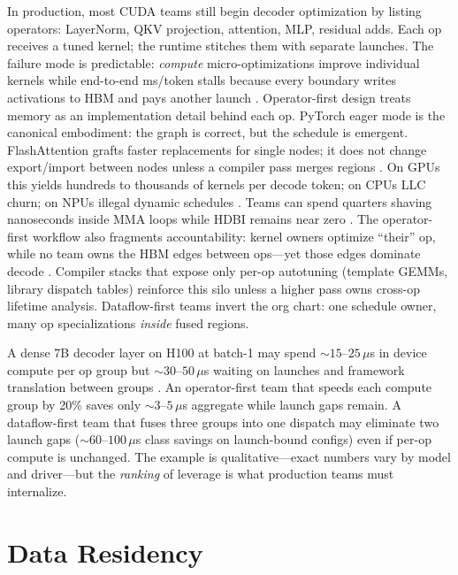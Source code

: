 In production, most CUDA teams still begin decoder optimization by listing operators: LayerNorm, QKV projection, attention, MLP, residual adds.
Each op receives a tuned kernel; the runtime stitches them with separate launches.
The failure mode is predictable: \emph{compute} micro-optimizations improve individual kernels while end-to-end ms/token stalls because every boundary writes activations to HBM and pays another launch \citep{taxbreak2026}.
Operator-first design treats memory as an implementation detail behind each op.
PyTorch eager mode is the canonical embodiment: the graph is correct, but the schedule is emergent.
FlashAttention grafts faster replacements for single nodes; it does not change export/import between nodes unless a compiler pass merges regions \citep{dao2022flashattention}.
On GPUs this yields hundreds to thousands of kernels per decode token; on CPUs LLC churn; on NPUs illegal dynamic schedules \citep{amd2024xdna}.
Teams can spend quarters shaving nanoseconds inside MMA loops while HDBI remains near zero \citep{taxbreak2026,memoryfloor2026}.
The operator-first workflow also fragments accountability: kernel owners optimize ``their'' op, while no team owns the HBM edges between ops---yet those edges dominate decode \citep{memoryfloor2026}.
Compiler stacks that expose only per-op autotuning (template GEMMs, library dispatch tables) reinforce this silo unless a higher pass owns cross-op lifetime analysis.
Dataflow-first teams invert the org chart: one schedule owner, many op specializations \emph{inside} fused regions.

\begin{example}
A dense 7B decoder layer on H100 at batch-1 may spend ${\sim}15$--$25$\,$\mu$s in device compute per op group but ${\sim}30$--$50$\,$\mu$s waiting on launches and framework translation between groups \citep{memoryfloor2026,taxbreak2026}.
An operator-first team that speeds each compute group by 20\% saves only ${\sim}3$--$5$\,$\mu$s aggregate while launch gaps remain.
A dataflow-first team that fuses three groups into one dispatch may eliminate two launch gaps (${\sim}60$--$100$\,$\mu$s class savings on launch-bound configs) even if per-op compute is unchanged.
The example is qualitative---exact numbers vary by model and driver---but the \emph{ranking} of leverage is what production teams must internalize.
\end{example}

\section{Data Residency}
\label{sec:data_residency}

